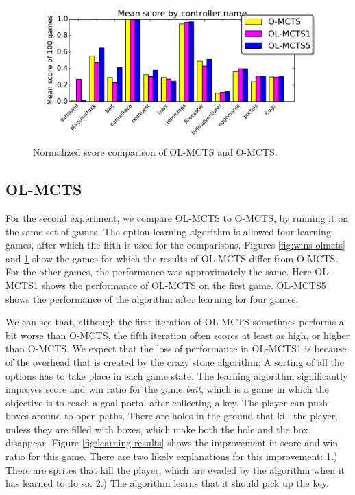\begin{figure}
	\centering
	\includegraphics[width=\columnwidth]{includes/scoresOLMCTS}
	\vspace{-.8cm}
	\caption{Normalized score comparison of OL-MCTS and O-MCTS.}
	\label{fig:scores-olmcts}
\end{figure}

\subsection{OL-MCTS}
\label{subsec:olmcts}
For the second experiment, we compare OL-MCTS to O-MCTS, by running it on the
same set of games. The option learning algorithm is allowed four learning games,
after which the fifth is used for the comparisons. Figures \ref{fig:wins-olmcts}
and \ref{fig:scores-olmcts} show the games for which the results of OL-MCTS
differ from O-MCTS. For the other games, the performance was approximately the
same. Here OL-MCTS1 shows the performance of OL-MCTS on the first game. OL-MCTS5
shows the performance of the algorithm after learning for four games. 

We can see that, although the first iteration of OL-MCTS sometimes performs a
bit worse than O-MCTS, the fifth iteration often scores at least as high, or
higher than O-MCTS. We expect that the loss of performance in OL-MCTS1 is
because of the overhead that is created by the crazy stone algorithm: A sorting
of all the options has to take place in each game state. The learning algorithm
significantly improves score and win ratio for the game \textit{bait}, which is
a game in which the objective is to reach a goal portal after collecting a key.
The player can push boxes around to open paths. There are holes in the ground
that kill the player, unless they are filled with boxes, which make both the
hole and the box disappear. Figure \ref{fig:learning-results} shows the
improvement in score and win ratio for this game. There are two likely 
explanations for this improvement: 1.) There are sprites that kill the player,
which are evaded by the algorithm when it has learned to do so.  2.) The
algorithm learns that it should pick up the key.


